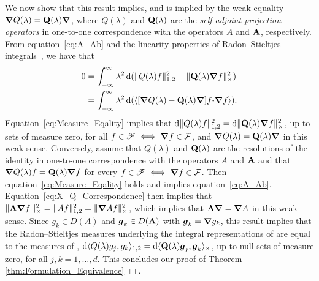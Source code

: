 \documentclass[amsa]{ipart}
\begin{document}
We now show that this result implies, and is implied by the weak
equality $\mbox{\boldmath${\nabla}$} Q(\lambda)=\mathbf{Q}(\lambda)\mbox{\boldmath${\nabla}$} $, where
$Q(\lambda)$ and $\mathbf{Q}(\lambda)$ are the \emph{self-adjoint projection operators}
in one-to-one correspondence with the operators $A$ and $\mathbf{A}$,
respectively. From equation~\eqref{eq:A_Ab} and the linearity
properties of Radon--Stieltjes integrals~\cite{Stone:64}, we have that    
%
\begin{align}\label{eq:Measure_Eqality}
  0&=\int_{-\infty}^\infty\lambda^2\,\d(\|Q(\lambda)f\|_{1,2}^2-\|\Qb(\lambda)\bnabla f\|_\times^2)
  \\
   &=\int_{-\infty}^\infty\lambda^2\,\d(\langle[\bnabla Q(\lambda)-\Qb(\lambda)\bnabla ]f\bcdot\bnabla f\rangle).
   \notag
\end{align}
%
Equation~\eqref{eq:Measure_Eqality} implies that
$\mathrm{d}\|Q(\lambda)f\|_{1,2}^2=\mathrm{d}\|\mathbf{Q}(\lambda)\mbox{\boldmath${\nabla}$} f\|_\times^2$, up to sets of measure
zero, for all $f\in\mathscr{F}\iff\mbox{\boldmath${\nabla}$} f\in\mathcal{F}$, and $\mbox{\boldmath${\nabla}$}
Q(\lambda)=\mathbf{Q}(\lambda)\mbox{\boldmath${\nabla}$} $ in this weak sense. Conversely, assume that
$Q(\lambda)$ and  
$\mathbf{Q}(\lambda)$ are the resolutions of the identity in one-to-one
correspondence with the operators $A$ and $\mathbf{A}$ and that $\mbox{\boldmath${\nabla}$}
Q(\lambda)f=\mathbf{Q}(\lambda)\mbox{\boldmath${\nabla}$} f$ for every $f\in\mathscr{F}\iff\mbox{\boldmath${\nabla}$} f\in\mathcal{F}$. Then
equation~\eqref{eq:Measure_Eqality} holds and implies
equation~\eqref{eq:A_Ab}. Equation~\eqref{eq:X_Q_Correspondence} then
implies that $\|\mathbf{A}\mbox{\boldmath${\nabla}$} f\,\|_\times^2=\|Af\|_{1,2}^2=\|\mbox{\boldmath${\nabla}$} Af\|_\times^2$, which
implies that $\mathbf{A}\mbox{\boldmath${\nabla}$} =\mbox{\boldmath${\nabla}$} A$ in this weak sense. Since 
$g_k\in D(A)$ and $\boldsymbol{g}_k\in D(\mathbf{A})$ with $\boldsymbol{g}_k=\mbox{\boldmath${\nabla}$} g_k$, this result implies
that the Radon--Stieltjes measures underlying the integral
representations of  are equal to the
measures of , $\mathrm{d}\langle
Q(\lambda)g_j,g_k\rangle_{1,2}=\mathrm{d}\langle\mathbf{Q}(\lambda)\boldsymbol{g}_j,\boldsymbol{g}_k\rangle_\times$, up to null
sets of  
measure zero, for all $j,k=1,\ldots,d$. This concludes our proof of Theorem
\ref{thm:Formulation_Equivalence} $\Box$.       
\end{document}
